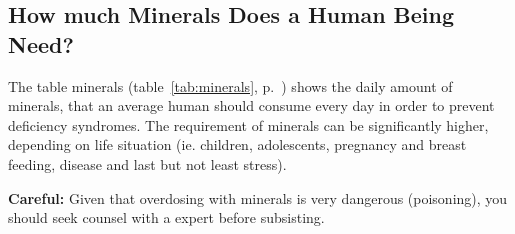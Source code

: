 \documentclass[../main.tex]{subfiles}
\begin{document}
\subsection{How much Minerals Does a Human Being Need?}

    The table minerals (table~\ref{tab:minerals}, p.~\pageref{tab:minerals}) shows the daily amount of minerals,
    that an average human should consume every day in order to prevent deficiency syndromes.
    The requirement of minerals can be significantly higher, depending on life situation
    (ie. children, adolescents, pregnancy and breast feeding, disease and last but not least stress).

    \textbf{Careful:} Given that overdosing with minerals is very dangerous (poisoning),
    you should seek counsel with a expert before subsisting.
\end{document}
